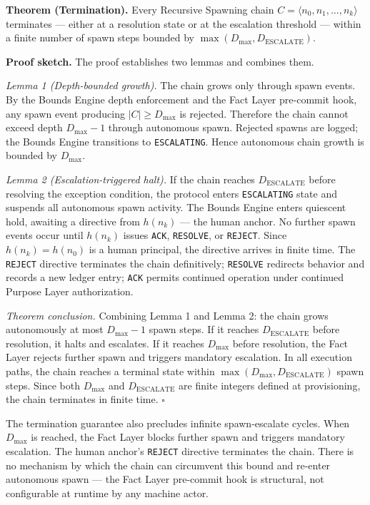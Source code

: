 \medskip
\noindent\textbf{Theorem (Termination).} Every Recursive Spawning chain $C = \langle n_0, n_1, \ldots, n_k \rangle$ terminates --- either at a resolution state or at the escalation threshold --- within a finite number of spawn steps bounded by $\max(D_{\mathrm{max}}, D_{\mathrm{ESCALATE}})$.

\medskip
\noindent\textbf{Proof sketch.} The proof establishes two lemmas and combines them.

\medskip
\textit{Lemma 1 (Depth-bounded growth).} The chain grows only through spawn events. By the Bounds Engine depth enforcement and the Fact Layer pre-commit hook, any spawn event producing $|C| \geq D_{\mathrm{max}}$ is rejected. Therefore the chain cannot exceed depth $D_{\mathrm{max}} - 1$ through autonomous spawn. Rejected spawns are logged; the Bounds Engine transitions to \texttt{ESCALATING}. Hence autonomous chain growth is bounded by $D_{\mathrm{max}}$.

\medskip
\textit{Lemma 2 (Escalation-triggered halt).} If the chain reaches $D_{\mathrm{ESCALATE}}$ before resolving the exception condition, the protocol enters \texttt{ESCALATING} state and suspends all autonomous spawn activity. The Bounds Engine enters quiescent hold, awaiting a directive from $h(n_k)$ --- the human anchor. No further spawn events occur until $h(n_k)$ issues \texttt{ACK}, \texttt{RESOLVE}, or \texttt{REJECT}. Since $h(n_k) = h(n_0)$ is a human principal, the directive arrives in finite time. The \texttt{REJECT} directive terminates the chain definitively; \texttt{RESOLVE} redirects behavior and records a new ledger entry; \texttt{ACK} permits continued operation under continued Purpose Layer authorization.

\medskip
\textit{Theorem conclusion.} Combining Lemma 1 and Lemma 2: the chain grows autonomously at most $D_{\mathrm{max}} - 1$ spawn steps. If it reaches $D_{\mathrm{ESCALATE}}$ before resolution, it halts and escalates. If it reaches $D_{\mathrm{max}}$ before resolution, the Fact Layer rejects further spawn and triggers mandatory escalation. In all execution paths, the chain reaches a terminal state within $\max(D_{\mathrm{max}}, D_{\mathrm{ESCALATE}})$ spawn steps. Since both $D_{\mathrm{max}}$ and $D_{\mathrm{ESCALATE}}$ are finite integers defined at provisioning, the chain terminates in finite time. $\square$

The termination guarantee also precludes infinite spawn-escalate cycles. When $D_{\mathrm{max}}$ is reached, the Fact Layer blocks further spawn and triggers mandatory escalation. The human anchor's \texttt{REJECT} directive terminates the chain. There is no mechanism by which the chain can circumvent this bound and re-enter autonomous spawn --- the Fact Layer pre-commit hook is structural, not configurable at runtime by any machine actor.


